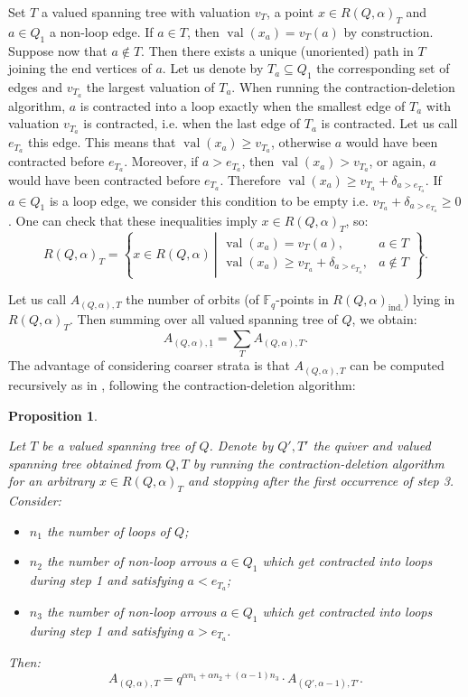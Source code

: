 \documentclass[11pt,english]{article}
\numberwithin{equation}{section}
\numberwithin{figure}{section}
\theoremstyle{definition}
\theoremstyle{plain}
\newtheorem{prop}[df]{Proposition}
\theoremstyle{remark}
\DeclareMathOperator{\val}{val}
\newcommand\FF{\mathbb{F}}
\begin{document}
Set $T$ a valued spanning tree with valuation $v_{T}$, a point $x\in R(Q,\alpha)_{T}$
and $a\in Q_{1}$ a non-loop edge. If $a\in T$, then $\val(x_{a})=v_{T}(a)$
by construction. Suppose now that $a\notin T$. Then there exists
a unique (unoriented) path in $T$ joining the end vertices of $a$.
Let us denote by $T_{a}\subseteq Q_{1}$ the corresponding set of
edges and $v_{T_{a}}$ the largest valuation of $T_{a}$. When running
the contraction-deletion algorithm, $a$ is contracted into a loop
exactly when the smallest edge of $T_{a}$ with valuation $v_{T_{a}}$
is contracted, i.e. when the last edge of $T_{a}$ is contracted.
Let us call $e_{T_{a}}$ this edge. This means that $\val(x_{a})\geq v_{T_{a}}$,
otherwise $a$ would have been contracted before $e_{T_{a}}$. Moreover,
if $a>e_{T_{a}}$, then $\val(x_{a})>v_{T_{a}}$, or again, $a$ would
have been contracted before $e_{T_{a}}$. Therefore $\val(x_{a})\geq v_{T_{a}}+\delta_{a>e_{T_{a}}}$.
If $a\in Q_{1}$ is a loop edge, we consider this condition to be
empty i.e. $v_{T_{a}}+\delta_{a>e_{T_{a}}}\geq0$. One can check that
these inequalities imply $x\in R(Q,\alpha)_{T}$, so:\[
R(Q,\alpha)_{T}
=
\left\{
x\in R(Q,\alpha)\
\left\vert 
\begin{array}{ll}
\val(x_{a})=v_{T}(a), & a\in T \\
\val(x_{a})\geq v_{T_{a}}+\delta_{a>e_{T_{a}}}, & a\not\in T
\end{array}
\right.
\right\}
.
\]

Let us call $A_{(Q,\alpha),T}$ the number of orbits (of $\FF_{q}$-points
in $R(Q,\alpha)_{\mathrm{ind.}}$) lying in $R(Q,\alpha)_{T}$. Then
summing over all valued spanning tree of $Q$, we obtain:\[
A_{(Q,\alpha),\underline{1}}=\sum_TA_{(Q,\alpha),T}.
\] The advantage of considering coarser strata is that $A_{(Q,\alpha),T}$
can be computed recursively as in \cite{AMRV22}, following the contraction-deletion
algorithm:

\begin{prop} \label{Prop/KacPolContDel}

Let $T$ be a valued spanning tree of $Q$. Denote by $Q',T'$ the
quiver and valued spanning tree obtained from $Q,T$ by running the
contraction-deletion algorithm for an arbitrary $x\in R(Q,\alpha)_{T}$
and stopping after the first occurrence of step 3. Consider: 
\begin{itemize}
\item $n_{1}$ the number of loops of $Q$; 
\item $n_{2}$ the number of non-loop arrows $a\in Q_{1}$ which get contracted
into loops during step 1 and satisfying $a<e_{T_{a}}$;
\item $n_{3}$ the number of non-loop arrows $a\in Q_{1}$ which get contracted
into loops during step 1 and satisfying $a>e_{T_{a}}$.
\end{itemize}
Then:\[
A_{(Q,\alpha),T}=q^{\alpha n_1 + \alpha n_2 + (\alpha-1)n_3}\cdot A_{(Q',\alpha-1),T'}.
\]

\end{prop}
\end{document}
